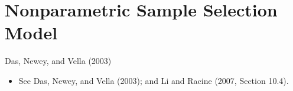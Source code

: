\documentclass[xcolor=svgnames,dvipdfmx,cjk]{beamer}
\theoremstyle{example}
\begin{document}
\section{Nonparametric Sample Selection Model}

\begin{frame}{Das, Newey, and Vella (2003)}
      \begin{itemize}
            \item See Das, Newey, and Vella (2003); and Li and Racine (2007, Section 10.4).
      \end{itemize}
\end{frame}
\end{document}
